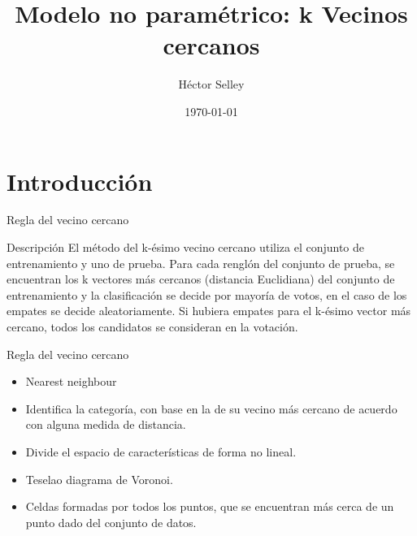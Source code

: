 \documentclass[11pt,aspectratio=169]{beamer}
\author{Héctor Selley}
\title{Modelo no paramétrico: k Vecinos cercanos}
\institute{Universidad Anáhuac México}
\date{\today}
\begin{document}

\begin{frame}
	\titlepage
\end{frame}


\section{Introducción}

\begin{frame}{Regla del vecino cercano}
\begin{block}{Descripción}
El método del k-ésimo vecino cercano utiliza el conjunto de entrenamiento y uno de prueba.
Para cada renglón del conjunto de prueba, se encuentran los k vectores más cercanos 
(distancia Euclidiana) del conjunto de entrenamiento y la clasificación se decide por mayoría
de votos, en el caso de los empates se decide aleatoriamente. Si hubiera empates para el
k-ésimo vector más cercano, todos los candidatos se consideran en la votación.
\end{block}
\end{frame}

\begin{frame}{Regla del vecino cercano}
\begin{itemize}
	\item Nearest neighbour\pause
	\item Identifica la categoría, con base en la de su vecino más cercano de acuerdo con alguna medida de distancia.\pause
	\item Divide el espacio de características de forma no lineal.\pause
	\item Tesela\footnotemark[1] o diagrama de Voronoi.\pause
	\item Celdas formadas por todos los puntos, que se encuentran más cerca de un punto dado del conjunto de datos.	
\end{itemize}
\end{frame}
\end{document}

